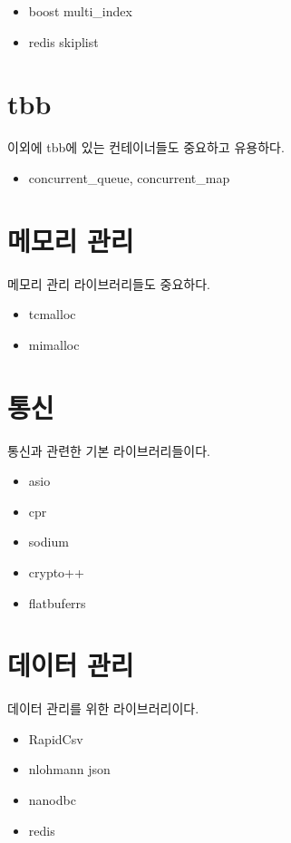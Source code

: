 \begin{itemize}
    \item boost multi\_index 
    \item redis skiplist
\end{itemize}

\section{tbb}

이외에 tbb에 있는 컨테이너들도 중요하고 유용하다. 

\begin{itemize}
    \item concurrent\_queue, concurrent\_map 
\end{itemize}


\section{메모리 관리}

메모리 관리 라이브러리들도 중요하다. 

\begin{itemize}
    \item tcmalloc 
    \item mimalloc
\end{itemize}

\section{통신}

통신과 관련한 기본 라이브러리들이다. 

\begin{itemize}
    \item asio 
    \item cpr 
    \item sodium 
    \item crypto++
    \item flatbuferrs
\end{itemize}

\section{데이터 관리}

데이터 관리를 위한 라이브러리이다. 

\begin{itemize}
    \item RapidCsv
    \item nlohmann json 
    \item nanodbc
    \item redis 
\end{itemize}


